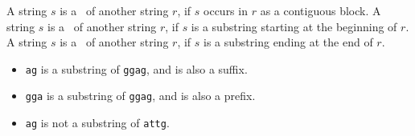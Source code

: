 \begin{flex}
\begin{definition}
A string $s$ is a~ of another string $r$, if $s$ occurs
in $r$ as a contiguous block.
%
A string $s$ is a~ of another string $r$, if $s$ is a substring
starting at the beginning of $r$.
% 
A string $s$ is a~ of another string $r$, if $s$ is a substring
ending at the end of $r$.
\end{definition}

\begin{example}
\begin{itemize}
\item
\texttt{ag} is a substring of \texttt{ggag}, and is also a suffix. 
\item
\texttt{gga} is a substring of \texttt{ggag}, and is also a prefix.
\item
\texttt{ag} is not a substring of \texttt{attg}.
\end{itemize}
\end{example}
\end{flex}

